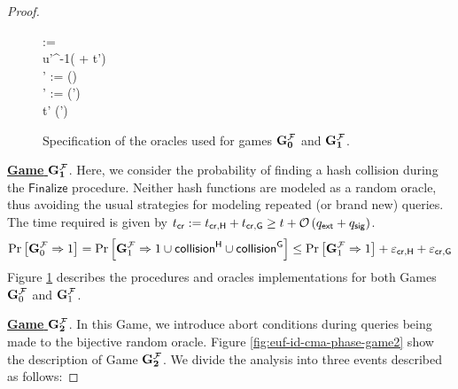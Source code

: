 \documentclass[version=submission, floatrow]{iacrcc}
\begin{document}
\begin{proof}
\begin{figure}[H]
\begin{pchstack}[center, boxed, space=1em]
\begin{pchstack}
{                 := \HashG{\msg{}^{\star}, \id{}^{\star}}\\
                  u'^{-1}( + t')\\
                \alpha' := \varphi()\\
                \beta' := \Pi(\alpha')\\
                \pcreturn t'  \psi(\beta')
                }
            \end{pchstack}
            \end{pchstack}
        \caption{Specification of the oracles used for games $\mathbf{G_{0}^{\mathcal{F}}}$ and $\mathbf{G_{1}^{\mathcal{F}}}$.}
        \label{fig:game0-and-game1}
    \end{figure}
    
    \noindent\underline{\textbf{Game} $\mathbf{G_{1}^{\mathcal{F}}}$}. Here, we consider the probability of finding a hash collision during the $\mathsf{Finalize}$ procedure. Neither hash functions are modeled as a random oracle, thus avoiding the usual strategies for modeling repeated (or brand new) queries. The time required is given by $t_{\mathsf{cr}} := t_{\mathsf{cr}, \mathsf{H}} + t_{\mathsf{cr}, \mathsf{G}} \ge t + \mathcal{O}\left(q_{\mathsf{ext}} + q_{\mathsf{sig}}\right)$.    
    \begin{equation*}\label{eq:game1}
            \mathrm{Pr}\left[\mathbf{G}_{0}^{\mathcal{F}} \Rightarrow 1\right] = \mathrm{Pr}\left[\mathbf{G}_{1}^{\mathcal{F}} \Rightarrow 1 \cup \mathsf{collision}^{\mathsf{H}} \cup \mathsf{collision}^{\mathsf{G}}\right] \le \mathrm{Pr}\left[\mathbf{G}_{1}^{\mathcal{F}} \Rightarrow 1\right] + \varepsilon_{\mathsf{cr}, \mathsf{H}} + \varepsilon_{\mathsf{cr}, \mathsf{G}}
    \end{equation*}
    Figure \ref{fig:game0-and-game1} describes the procedures and oracles implementations for both Games $\mathbf{G}_{0}^{\mathcal{F}}$ and $\mathbf{G}_{1}^{\mathcal{F}}$.

    \noindent\underline{\textbf{Game} $\mathbf{G_{2}^{\mathcal{F}}}$}. In this Game, we introduce abort conditions during queries being made to the bijective random oracle.
    Figure \ref{fig:euf-id-cma-phase-game2} show the description of Game $\mathbf{G_{2}^{\mathcal{F}}}$.
    We divide the analysis into three events described as follows:
    

\end{proof}
\end{document}
